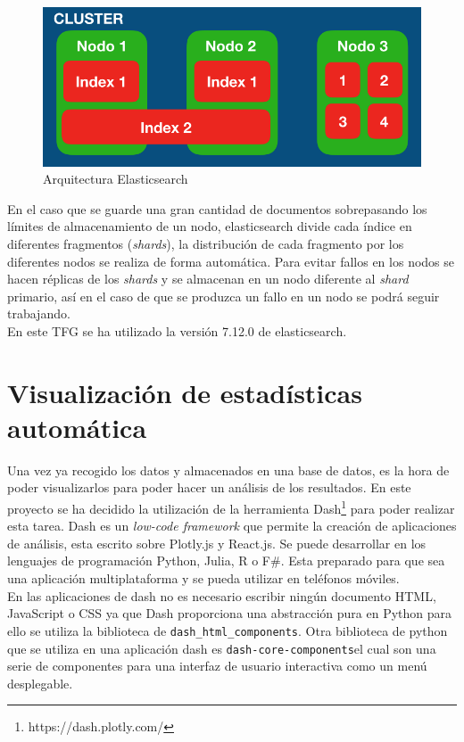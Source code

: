 \begin{figure}[H]
    \centering
    \includegraphics[width=12cm, keepaspectratio]{img/arquitectura_elastic.png}
    \caption{Arquitectura Elasticsearch}
    \label{fig:elastic}
\end{figure}
En el caso que se guarde una gran cantidad de documentos sobrepasando los límites de almacenamiento de un nodo, elasticsearch divide cada índice en diferentes fragmentos (\textit{shards}), la distribución de cada fragmento por los diferentes nodos se realiza de forma automática. Para evitar fallos en los nodos se hacen réplicas de los \textit{shards} y se almacenan en un nodo diferente al \textit{shard} primario, así en el caso de que se produzca un fallo en un nodo se podrá seguir trabajando.\\

En este TFG se ha utilizado la versión 7.12.0 de elasticsearch.
\newpage

\section{Visualización de estadísticas automática}

Una vez ya recogido los datos y almacenados en una base de datos, es la hora de poder visualizarlos para poder hacer un análisis de los resultados. En este proyecto se ha decidido la utilización de la herramienta Dash\footnote{https://dash.plotly.com/} para poder realizar esta tarea. Dash es un \textit{low-code framework} que permite la creación de aplicaciones de análisis, esta escrito sobre Plotly.js y React.js. Se puede desarrollar en los lenguajes de programación Python, Julia, R o F#. Esta preparado para que sea una aplicación multiplataforma y se pueda utilizar en teléfonos móviles.\cite{dash}\\

En las aplicaciones de dash no es necesario escribir ningún documento HTML, JavaScript o CSS ya que Dash proporciona una abstracción pura en Python para ello se utiliza la biblioteca de \texttt{dash\_html\_components}. Otra biblioteca de python que se utiliza en una aplicación dash es \texttt{dash-core-components}el cual son una serie de componentes para una interfaz de usuario interactiva como un menú desplegable.\\

